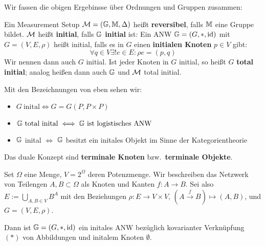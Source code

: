 Wir fassen die obigen Ergebinsse über Ordnungen und Gruppen zusammen:
\begin{definition}
    Ein Measurement Setup $\mathcal{M} = (\mathbb{G}, \mathbb{M}, \Delta)$ heißt \textbf{reversibel},
    falls $\mathbb{M}$ eine Gruppe bildet.
    $\mathcal{M}$ heißt \textbf{initial}, falls $\mathbb{G}$ \textbf{initial} ist:
    Ein ANW $\mathbb{G} = (G, *, \operatorname{id})$ mit $G = (V, E, \rho)$ heißt initial, falls es in $G$ einen \textbf{initialen Knoten} $p\in V$ gibt:
    \[
        \forall q\in V\exists!e\in E\colon \rho e = (p, q)
    \]
    Wir nennen dann auch $G$ initial.
    Ist jeder Knoten in $G$ initial, so heißt $G$ \textbf{total initial};
    analog heißen dann auch $\mathbb{G}$ und $\mathcal{M}$ total initial.
\end{definition}
Mit den Bezeichnungen von eben sehen wir:
\begin{itemize}
    \item $G~\text{inital} \iff G = G(P, P\times P)$
    \item $\mathbb{G}~\text{total inital} \iff \mathbb{G}~\text{ist logistisches ANW}$
    \item $\mathbb{G}$ inital $\iff$ $\mathbb{G}$ besitzt ein initales Objekt im Sinne der Kategorientheorie
\end{itemize}
Das duale Konzept sind \textbf{terminale Knoten} bzw.~\textbf{terminale Objekte}.
\begin{beispiel}
    Set $\Omega$ eine Menge, $V = 2^\Omega$ deren Potenzmenge.
    Wir beschreiben das Netzwerk von Teilengen $A, B\subset \Omega$ als Knoten und Kanten $f\colon A\to B$.
    Sei also $E := \bigcup_{A, B\in V} B^A$ mit den Beziehungen
    $\rho\colon E\to V\times V,\, (A\xrightarrow{f} B) \mapsto (A, B)$,
    und $G = (V, E, \rho)$.

    Dann ist $\mathbb{G} = (G, *, \operatorname{id})$ ein initales ANW bezüglich kovarianter Verknüpfung $(*)$ von Abbildungen und initalem Knoten $\emptyset$.
\end{beispiel}

